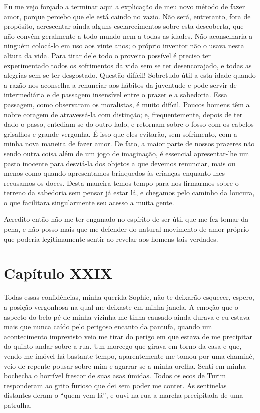  Eu me vejo forçado a terminar aqui a explicação de meu novo método de
fazer amor, porque percebo que ele está caindo no vazio. Não será,
entretanto, fora de propósito, acrescentar ainda alguns esclarecimentos
sobre esta descoberta, que não convém geralmente a todo mundo nem a
todas as idades. Não aconselharia a ninguém colocá-lo em uso aos vinte
anos; o próprio inventor não o usava nesta altura da vida. Para tirar
dele todo o proveito possível é preciso ter experimentado todos os
sofrimentos da vida sem se ter desencorajado, e todas as alegrias sem
se ter desgostado. Questão difícil! Sobretudo útil a esta idade quando
a razão nos aconselha a renunciar aos hábitos da juventude e pode
servir de intermediária e de passagem insensível entre o prazer e a
sabedoria. Essa passagem, como observaram os moralistas, é muito
difícil. Poucos homens têm a nobre coragem de atravessá-la com
distinção; e, frequentemente, depois de ter dado o passo, entediam-se
do outro lado, e retornam sobre o fosso com os cabelos grisalhos e
grande vergonha. É isso que eles evitarão, sem sofrimento, com a minha
nova maneira de fazer amor. De fato, a maior parte de nossos prazeres
não sendo outra coisa além de um jogo de imaginação, é essencial
apresentar-lhe um pasto inocente para desviá-la dos objetos a que
devemos renunciar, mais ou menos como quando apresentamos brinquedos às
crianças enquanto lhes recusamos os doces. Desta maneira temos tempo
para nos firmarmos sobre o terreno da sabedoria sem pensar já estar lá,
e chegamos pelo caminho da loucura, o que facilitara singularmente seu
acesso a muita gente. 

 Acredito então não me ter enganado no espírito de ser útil que me fez
tomar da pena, e não posso mais que me defender do natural movimento de                      
amor-próprio que poderia legitimamente sentir ao revelar aos homens
tais verdades.

\section*{Capítulo XXIX}

 Todas essas confidências, minha querida Sophie, não te deixarão
esquecer, espero, a posição vergonhosa na qual me deixaste em minha
janela. A emoção que o aspecto do belo pé de minha vizinha me tinha
causado ainda durava e eu estava mais que nunca caído pelo perigoso
encanto da pantufa, quando um acontecimento imprevisto veio me tirar do
perigo em que estava de me precipitar do quinto andar sobre a rua. Um
morcego que girava em torno da casa e que, vendo-me imóvel há bastante
tempo, aparentemente me tomou por uma chaminé, veio de repente pousar
sobre mim e agarrar-se a minha orelha. Senti em minha bochecha o
horrível frescor de suas asas úmidas. Todos os ecos de Turim
responderam ao grito furioso que dei sem poder me conter. As sentinelas
distantes deram o ``quem vem lá'', e ouvi na rua a marcha precipitada de
uma patrulha.  

